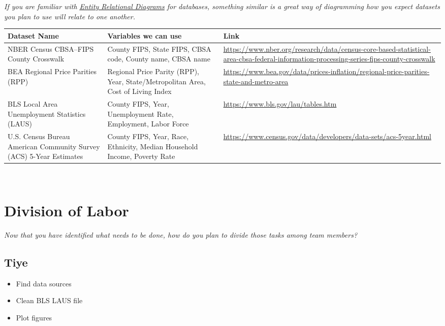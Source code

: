 \documentclass[12pt]{article}
\begin{document}
\emph{If you are familiar with \href{https://www.visual-paradigm.com/guide/data-modeling/what-is-entity-relationship-diagram/}{\underline{Entity Relational Diagrams}} for databases, something similar is a great way of diagramming how you expect datasets you plan to use will relate to one another.}

\begin{tabular}{>{\raggedright\arraybackslash}p{} | >{\raggedright\arraybackslash}p{} | >{\raggedright\arraybackslash}p{}}
    \textbf{Dataset Name}& \textbf{Variables we can use} & \textbf{Link}  \\ \hline
    NBER Census CBSA–FIPS County Crosswalk & County FIPS, State FIPS, CBSA code, County name, CBSA name & \url{https://www.nber.org/research/data/census-core-based-statistical-area-cbsa-federal-information-processing-series-fips-county-crosswalk} \\ \hline
    BEA Regional Price Parities (RPP) & Regional Price Parity (RPP), Year, State/Metropolitan Area, Cost of Living Index & \url{https://www.bea.gov/data/prices-inflation/regional-price-parities-state-and-metro-area} \\ \hline
    BLS Local Area Unemployment Statistics (LAUS) & County FIPS, Year, Unemployment Rate, Employment, Labor Force & \url{https://www.bls.gov/lau/tables.htm} \\ \hline
    U.S. Census Bureau American Community Survey (ACS) 5-Year Estimates & County FIPS, Year, Race, Ethnicity, Median Household Income, Poverty Rate & \url{https://www.census.gov/data/developers/data-sets/acs-5year.html}
\end{tabular}
\vspace*{2cm}\\

\section{Division of Labor}

\emph{Now that you have identified what needs to be done, how do you plan to 
divide those tasks among team members?}

\subsection{Tiye}
\begin{itemize}
    \item Find data sources
    \item Clean BLS LAUS file
    \item Plot figures
\end{itemize}
\end{document}
